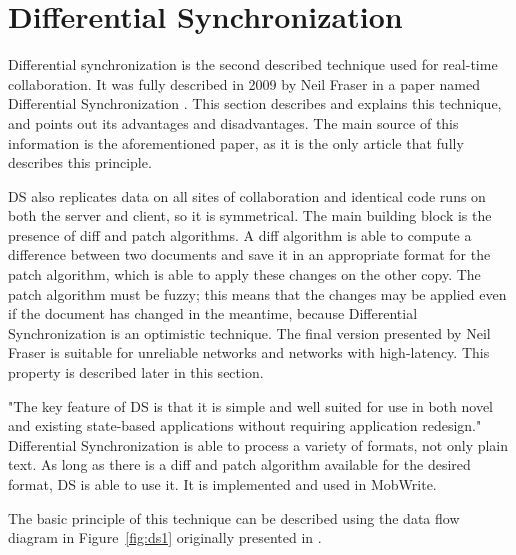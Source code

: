\documentclass[12pt,oneside]{fithesis2}
\begin{document}
\section{Differential Synchronization}
\par Differential synchronization is the second described technique used for real-time collaboration. It was fully described in 2009 by Neil Fraser in a paper named Differential Synchronization \cite{Fraser}. This section describes and explains this technique, and points out its advantages and disadvantages. The main source of this information is the aforementioned paper, as it is the only article that fully describes this principle.
\par DS also replicates data on all sites of collaboration and identical code runs on both the server and client, so it is symmetrical. The main building block is the presence of diff and patch algorithms. A diff algorithm is able to compute a difference between two documents and save it in an appropriate format for the patch algorithm, which is able to apply these changes on the other copy. The patch algorithm must be fuzzy; this means that the changes may be applied even if the document has changed in the meantime, because Differential Synchronization is an optimistic technique. The final version presented by Neil Fraser is suitable for unreliable networks and networks with high-latency. This property is described later in this section.
\par "The key feature of DS is that it is simple and well suited for use in both novel and existing state-based applications without requiring application redesign." \cite{Fraser} Differential Synchronization is able to process a variety of formats, not only plain text. As long as there is a diff and patch algorithm available for the desired format, DS is able to use it. It is implemented and used in MobWrite. 
\par The basic principle of this technique can be described using the data flow diagram in Figure~\ref{fig:ds1} originally presented in \cite{Fraser}.  
\end{document}
